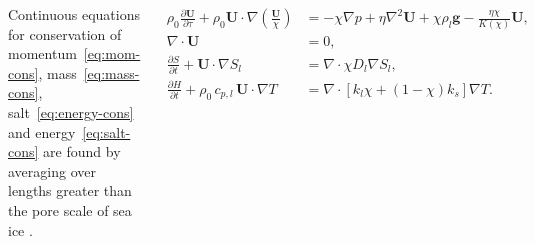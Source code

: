 \documentclass[landscape,24pt, a0paper,colspace=10mm,blockverticalspace=12mm]{tikzposter}
\begin{document}
\begin{columns}
{}

{
Continuous equations for conservation of momentum~\eqref{eq:mom-cons}, mass~\eqref{eq:mass-cons}, salt~\eqref{eq:energy-cons} and energy~\eqref{eq:salt-cons} are found by averaging over lengths greater than the pore scale of sea ice \cite{Worster1991,LeBars2006}. \\
\begin{minipage}[t]{0.49\linewidth}
\begin{align}
     \rho_0  \frac{\partial \mathbf{U}}{\partial \tau} + \rho_0 \mathbf{U} \cdot \nabla \left( \frac{\mathbf{U}}{\chi} \right) &= - \chi \nabla p + \eta \nabla^2 \mathbf{U} + \chi \rho_l \mathbf{g} - \frac{\eta \chi}{K(\chi)} \mathbf{U}, \label{eq:mom-cons} \\
   \nabla \cdot \mathbf{U} &= 0, \label{eq:mass-cons}  \\
    \frac{\partial S}{\partial t} + \mathbf{U} \cdot \nabla S_l &= \nabla \cdot \chi D_l \nabla S_l, \label{eq:salt-cons} \\
    \frac{\partial H}{\partial t} + \rho_0 \, c_{p,l} \, \mathbf{U} \cdot \nabla  T &= \nabla \cdot \left[ k_l \chi + (1-\chi) k_s \right] \nabla T . \label{eq:energy-cons}

\end{align}
\end{minipage}}
\end{columns}
\end{document}
